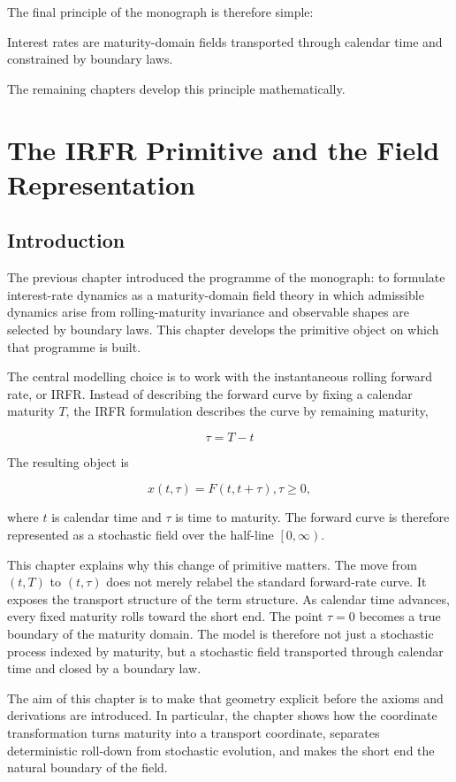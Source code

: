 \documentclass[11pt,oneside]{book}
\begin{document}
The final principle of the monograph is therefore simple:

Interest rates are maturity-domain fields transported through calendar
time and constrained by boundary laws.

The remaining chapters develop this principle mathematically.

\chapter{The IRFR Primitive and the Field Representation}\label{chapter-2}

\section{Introduction}\label{introduction}

The previous chapter introduced the programme of the monograph: to
formulate interest-rate dynamics as a maturity-domain field theory in
which admissible dynamics arise from rolling-maturity invariance and
observable shapes are selected by boundary laws. This chapter develops
the primitive object on which that programme is built.

The central modelling choice is to work with the instantaneous rolling
forward rate, or IRFR. Instead of describing the forward curve by fixing
a calendar maturity $T$, the IRFR formulation describes the curve by
remaining maturity,

\[
\tau = T - t
\]

The resulting object is

\[
x(t,\tau) = F(t,t+\tau), \tau \ge 0,
\]

where $t$ is calendar time and $\tau$ is time to maturity. The forward curve is
therefore represented as a stochastic field over the half-line \(\left[0,\infty\right)\).

This chapter explains why this change of primitive matters. The move
from \((t,T)\) to \((t,\tau)\) does not merely relabel the standard forward-rate
curve. It exposes the transport structure of the term structure. As
calendar time advances, every fixed maturity rolls toward the short end.
The point $\tau=0$ becomes a true boundary of the maturity domain. The model
is therefore not just a stochastic process indexed by maturity, but a
stochastic field transported through calendar time and closed by a
boundary law.

The aim of this chapter is to make that geometry explicit before the
axioms and derivations are introduced. In particular, the chapter shows
how the coordinate transformation turns maturity into a transport
coordinate, separates deterministic roll-down from stochastic evolution,
and makes the short end the natural boundary of the field.
\end{document}
